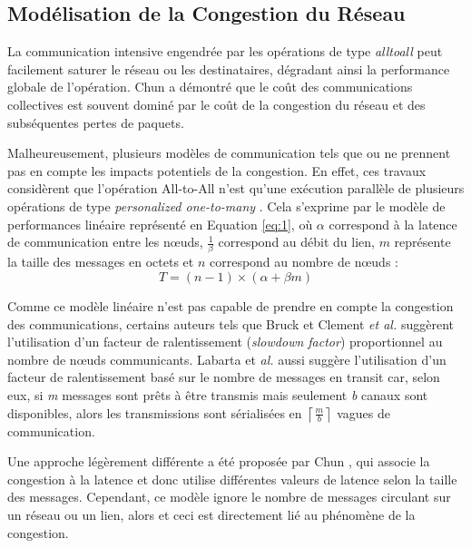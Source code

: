 \subsection{Modélisation de la Congestion du Réseau\label{cluster}}

La communication intensive engendrée par les opérations de type \textit{alltoall} peut facilement saturer le réseau ou les destinataires, dégradant ainsi la performance globale de l'opération. Chun \cite{Chun01} a démontré que le coût des communications collectives est souvent dominé par le coût de la congestion du réseau et des subséquentes pertes de paquets.

Malheureusement, plusieurs modèles de communication tels que \cite{Christara99} ou \cite{Pjesivac-Grbovic05} ne prennent pas en compte les impacts potentiels de la congestion. En effet, ces travaux considèrent que l'opération All-to-All n'est qu'une exécution parallèle de plusieurs opérations de type \emph{personalized one-to-many} \cite{Johnsson89}. Cela s'exprime par le modèle de performances linéaire représenté en Equation \ref{eq:1}, où $\alpha$ correspond à la latence de communication entre les n{\oe}uds, $\frac{1}{\beta}$ correspond au débit du lien, $m$ représente la taille des messages en octets et  $n$ correspond au nombre de n{\oe}uds :
\begin{equation}
T=(n-1)\times(\alpha+\beta m)\label{eq:1}
\end{equation}

Comme ce modèle linéaire n'est pas capable de prendre en compte la congestion des communications, certains auteurs tels que Bruck \cite{Bruck97b} et Clement \emph{et al.} \cite{Clement96} suggèrent l'utilisation d'un facteur de ralentissement (\emph{slowdown factor}) proportionnel au nombre de n{\oe}uds communicants.  Labarta et \emph{al.} \cite{Labarta96} aussi suggère l'utilisation d'un facteur de ralentissement basé sur le nombre de messages en transit car, selon eux, si \emph{m} messages sont prêts à être transmis mais seulement \emph{b} canaux sont disponibles, alors les transmissions sont sérialisées en $\left\lceil \frac{m}{b}\right\rceil $ vagues de communication. 

Une approche légèrement différente a été proposée par Chun \cite{Chun01}, qui associe la congestion à la latence et donc utilise différentes valeurs de latence selon la taille des messages. Cependant, ce modèle ignore le nombre de messages circulant sur un réseau ou un lien, alors et ceci est directement lié au phénomène de la congestion. 

